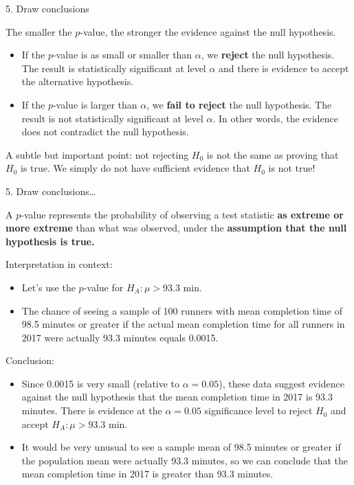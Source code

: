 \documentclass[
  ignorenonframetext,
  aspectratio=169]{beamer}
\begin{document}
\begin{frame}{5. Draw conclusions}
\protect\hypertarget{draw-conclusions}{}
\small

The smaller the \(p\)-value, the stronger the evidence against the null
hypothesis.

\begin{itemize}
\item
  If the \(p\)-value is as small or smaller than \(\alpha\), we
  \textbf{reject} the null hypothesis. The result is statistically
  significant at level \(\alpha\) and there is evidence to accept the
  alternative hypothesis.
\item
  If the \(p\)-value is larger than \(\alpha\), we \textbf{fail to
  reject} the null hypothesis. The result is not statistically
  significant at level \(\alpha\). In other words, the evidence does not
  contradict the null hypothesis.
\end{itemize}

A subtle but important point: not rejecting \(H_0\) is not the same as
proving that \(H_0\) is true. We simply do not have sufficient evidence
that \(H_0\) is not true!
\end{frame}

\begin{frame}{5. Draw conclusions\ldots{}}
\protect\hypertarget{draw-conclusions-1}{}
\small

A \(p\)-value represents the probability of observing a test statistic
\textbf{as extreme or more extreme} than what was observed, under the
\textbf{assumption that the null hypothesis is true.}

Interpretation in context:

\begin{itemize}
\item
  Let's use the \(p\)-value for \(H_A: \mu > 93.3\) min.
\item
  The chance of seeing a sample of 100 runners with mean completion time
  of 98.5 minutes or greater if the actual mean completion time for all
  runners in 2017 were actually 93.3 minutes equals 0.0015.
\end{itemize}

Conclusion:

\begin{itemize}
\item
  Since 0.0015 is very small (relative to \(\alpha = 0.05\)), these data
  suggest evidence against the null hypothesis that the mean completion
  time in 2017 is 93.3 minutes. There is evidence at the
  \(\alpha = 0.05\) significance level to reject \(H_0\) and accept
  \(H_A: \mu > 93.3\) min.
\item
  It would be very unusual to see a sample mean of 98.5 minutes or
  greater if the population mean were actually 93.3 minutes, so we can
  conclude that the mean completion time in 2017 is greater than 93.3
  minutes.
\end{itemize}
\end{frame}
\end{document}
